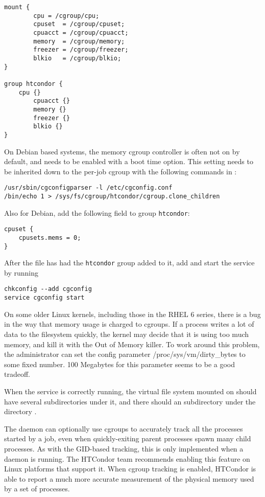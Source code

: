 \begin{verbatim}
mount {
        cpu	= /cgroup/cpu;
        cpuset	= /cgroup/cpuset;
        cpuacct = /cgroup/cpuacct;
        memory  = /cgroup/memory;
        freezer = /cgroup/freezer;
        blkio   = /cgroup/blkio;
}

group htcondor {
	cpu {}
        cpuacct {}
        memory {}
        freezer {}
        blkio {}
}
\end{verbatim}

On Debian based systems, the memory cgroup controller is often not 
on by default, and needs to be enabled with a boot time option.
This setting needs to be inherited
down to the per-job cgroup with the following commands in :

\begin{verbatim}
/usr/sbin/cgconfigparser -l /etc/cgconfig.conf
/bin/echo 1 > /sys/fs/cgroup/htcondor/cgroup.clone_children
\end{verbatim}

Also for Debian, add the following field to group \texttt{htcondor}:

\begin{verbatim}
cpuset {
	cpusets.mems = 0;
}
\end{verbatim}

After the  file has had the \texttt{htcondor} group
added to it, add and start the  service by running

\begin{verbatim}
chkconfig --add cgconfig
service cgconfig start
\end{verbatim}

On some older Linux kernels, including those in the RHEL 6 series, there
is a bug in the way that memory usage is charged to cgroups.  If a
process writes a lot of data to the filesystem quickly, the kernel
may decide that it is using too much memory, and kill it with the
Out of Memory killer.  To work around this problem, the administrator
can set the config parameter /proc/sys/vm/dirty\_bytes to some fixed 
number.  100 Megabytes for this parameter seems to be a good tradeoff.

When the  service is correctly running, 
the virtual file system
mounted on  should have several subdirectories under it, 
and there should an  subdirectory under the directory 
.

The  daemon can optionally use cgroups
to accurately track all the processes started by a job, 
even when quickly-exiting parent processes spawn many child processes.
As with the GID-based tracking, this is only implemented when a 
 daemon is running.  The HTCondor team recommends enabling 
this feature on Linux platforms that support it.  
When cgroup tracking is enabled, 
HTCondor is able to report a much more accurate
measurement of the physical memory used by a set of processes.

